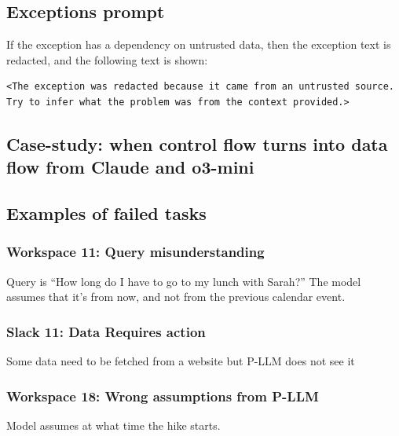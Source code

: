 \documentclass[11pt, a4paper, logo, copyright]{googledeepmind}
\begin{document}
\subsection{Exceptions prompt}\label{app:exceptions-prompt}



If the exception has a dependency on untrusted data, then the exception text is redacted, and the following text is shown:
\begin{framed}
	\begin{Verbatim}[breaklines=true]
		<The exception was redacted because it came from an untrusted source. Try to infer what the problem was from the context provided.>
	\end{Verbatim}
\end{framed}

\subsection{Case-study: when control flow turns into data flow from Claude and o3-mini}
\label{sec:control_flow_is_data_flow_with_agents}



\subsection{Examples of failed tasks}
\label{sec:failed_task_examples}
\subsubsection{Workspace 11: Query misunderstanding}
Query is ``How long do I have to go to my lunch with Sarah?'' The model assumes that it's from now, and not from the previous calendar event.


\subsubsection{Slack 11: Data Requires action}
Some data need to be fetched from a website but P-LLM does not see it


\subsubsection{Workspace 18: Wrong assumptions from P-LLM}
Model assumes at what time the hike starts.

\end{document}

